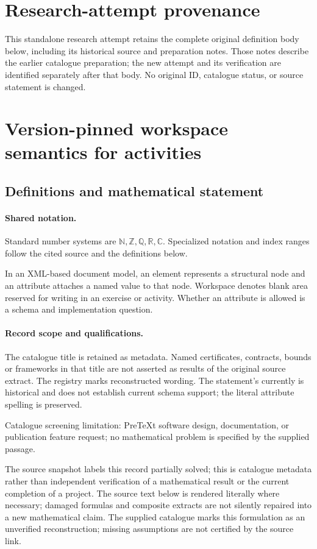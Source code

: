 \documentclass[11pt]{article}
\begin{document}
\section*{Research-attempt provenance}
This standalone research attempt retains the complete original definition body below,
including its historical source and preparation notes. Those notes describe the
earlier catalogue preparation; the new attempt and its verification are identified
separately after that body. No original ID, catalogue status, or source statement is changed.

\section{Version-pinned workspace semantics for activities}\label{statement}

\subsection{Definitions and mathematical statement}

\paragraph{Shared notation.}Standard number systems are $\mathbb N,\mathbb Z,\mathbb Q,\mathbb R,\mathbb C$. Specialized notation and index ranges follow the cited source and the definitions below.


In an XML-based document model, an element represents a structural node and an attribute attaches a named value to that node. Workspace denotes blank area reserved for writing in an exercise or activity. Whether an attribute is allowed is a schema and implementation question.
\paragraph{Record scope and qualifications.}
The catalogue title is retained as metadata. Named certificates, contracts, bounds or frameworks in that title are not asserted as results of the original source extract.
The registry marks reconstructed wording. The statement's currently is historical and does not establish current schema support; the literal attribute spelling is preserved.

Catalogue screening limitation: PreTeXt software design, documentation, or publication feature request; no mathematical problem is specified by the supplied passage.

The source snapshot labels this record partially solved; this is catalogue metadata rather than independent verification of a mathematical result or the current completion of a project.
The source text below is rendered literally where necessary; damaged formulas and composite extracts are not silently repaired into a new mathematical claim.
The supplied catalogue marks this formulation as an unverified reconstruction; missing assumptions are not certified by the source link.
\end{document}
